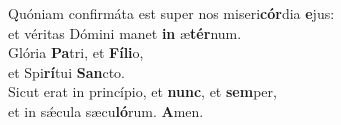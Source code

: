 \evenverse Quóniam confirmáta est super nos miseri\textbf{cór}dia \textbf{e}jus:~\*\\
\evenverse et véritas Dómini manet \textbf{in} æ\textbf{tér}num.\\
\oddverse Glória \textbf{Pa}tri, et \textbf{Fí}\textbf{li}o,~\*\\
\oddverse et Spi\textbf{rí}tui \textbf{San}cto.\\
\evenverse Sicut erat in princípio, et \textbf{nunc}, et \textbf{sem}per,~\*\\
\evenverse et in sǽcula sæcu\textbf{ló}rum. \textbf{A}men.\\
